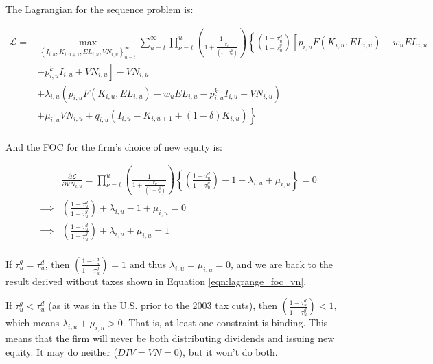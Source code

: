 \documentclass[letterpaper,12pt]{article}
\theoremstyle{definition}
\begin{document}
\begin{spacing}{1.5}
The Lagrangian for the sequence problem is:

\begin{equation}
\label{eqn:firm_lagrange_tax}
\begin{split}
\mathcal{L} = &  \max_{\left\{I_{i,u},K_{i,u+1},EL_{i,u},VN_{i,u}\right\}_{u=t}^{\infty}} \sum_{u=t}^{\infty} \prod_{\nu=t}^{u} \left(\frac{1}{1+\frac{r_{v}}{(1-\tau^{g}_{\nu})}}\right)\left\{ \left(\frac{1-\tau^{d}_{u}}{1-\tau^{g}_{u}}\right) \left[p_{i,u}F(K_{i,u},EL_{i,u}) - w_{u}EL_{i,u} \right. \right.\\
       & \left. \left. -p^{k}_{i,u}I_{i,u} +VN_{i,u}\right] - VN_{i,u} \right. \\
       &+\left. \lambda_{i,u}(p_{i,u}F(K_{i,u},EL_{i,u}) - w_{u}EL_{i,u} -p^{k}_{i,u}I_{i,u} +VN_{i,u}) \right. \\
       &+ \left. \mu_{i,u}VN_{i,u} + q_{i,u}(I_{i,u} - K_{i,u+1} + (1-\delta)K_{i,u})\right\} \\
\end{split}
\end{equation}

And the FOC for the firm's choice of new equity is:

\begin{equation}
\label{eqn:lagrange_foc_vn_tax}
\begin{split}
& \frac{\partial \mathcal{L}}{\partial VN_{i,u}} =   \prod_{\nu=t}^{u} \left(\frac{1}{1+\frac{r_{\nu}}{(1-\tau^{g}_{\nu})}}\right) \left\{\left(\frac{1-\tau^{d}_{u}}{1-\tau^{g}_{u}}\right) - 1 +\lambda_{i,u}  + \mu_{i,u} \right\} = 0 \\
\implies & \left(\frac{1-\tau^{d}_{u}}{1-\tau^{g}_{u}}\right) +\lambda_{i,u}- 1  + \mu_{i,u}  = 0 \\
\implies &   \left(\frac{1-\tau^{d}_{u}}{1-\tau^{g}_{u}}\right) + \lambda_{i,u} + \mu_{i,u} = 1  \\
\end{split}
\end{equation}

If $\tau^{g}_{u}=\tau^{d}_{u}$, then $ \left(\frac{1-\tau^{d}_{u}}{1-\tau^{g}_{u}}\right)=1$ and thus $\lambda_{i,u}= \mu_{i,u}=0$, and we are back to the result derived without taxes shown in Equation \ref{eqn:lagrange_foc_vn}.

If $\tau^{g}_{u}<\tau^{d}_{u}$ (as it was in the U.S. prior to the 2003 tax cuts), then $ \left(\frac{1-\tau^{d}_{u}}{1-\tau^{g}_{u}}\right)<1$, which means $ \lambda_{i,u} + \mu_{i,u} >0$.  That is, at least one constraint is binding. This means that the firm will never be both distributing dividends and issuing new equity.  It may do neither ($DIV=VN=0$), but it won't do both.  


\end{spacing}
\end{document}
